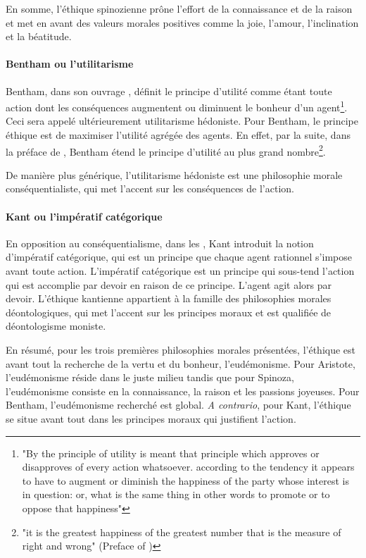 En somme, l'éthique spinozienne prône l'effort de la connaissance et de la raison et met en avant des valeurs morales positives comme la joie, l'amour, l'inclination et la béatitude. 


\paragraph{Bentham ou l'utilitarisme}


Bentham, dans son ouvrage , définit le principe d'utilité comme étant toute action dont les conséquences augmentent ou diminuent le bonheur d'un agent\footnote{"By the principle of utility is meant that
principle which approves or disapproves of every action whatsoever.
according to the tendency it appears to have to augment or diminish the
happiness of the party whose interest is in question: or, what is the same
thing in other words to promote or to oppose that happiness"}. Ceci sera appelé ultérieurement utilitarisme hédoniste. Pour Bentham, le principe éthique est de maximiser l'utilité agrégée des agents. En effet, par la suite, dans la préface de , Bentham étend le principe d'utilité au plus grand nombre\footnote{
"it is the greatest happiness of the greatest number that is the measure of right and wrong" (Preface of )}.

De manière plus générique, l'utilitarisme hédoniste est une philosophie morale conséquentialiste, qui met l'accent sur les conséquences de l'action.

\paragraph{Kant ou l'impératif catégorique}


En opposition au conséquentialisme, dans les , Kant introduit la notion d'impératif catégorique, qui est un principe que chaque agent rationnel s'impose avant toute action. L'impératif catégorique est un principe qui sous-tend l'action qui est accomplie par devoir en raison de ce principe. L'agent agit alors par devoir. L'éthique kantienne appartient à la famille des philosophies morales déontologiques, qui met l'accent sur les principes moraux et est qualifiée de déontologisme moniste.

En résumé, pour les trois premières philosophies morales présentées, l'éthique est avant tout la recherche de la vertu et du bonheur, l'eudémonisme. Pour Aristote, l'eudémonisme réside dans le juste milieu tandis que pour Spinoza, l'eudémonisme consiste en la connaissance, la raison et les passions joyeuses. Pour Bentham, l'eudémonisme recherché est global. \textit{A contrario}, pour Kant, l'éthique se situe avant tout dans les principes moraux qui justifient l'action.


